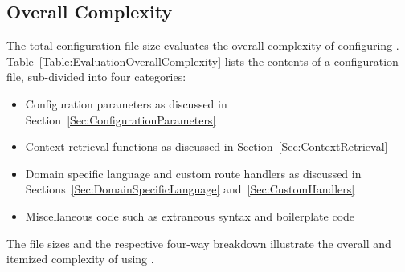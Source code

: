 \subsection{Overall Complexity}

The total configuration file size evaluates the overall complexity of configuring \sys{}. Table~\ref{Table:EvaluationOverallComplexity} lists the contents of a configuration file, sub-divided into four categories:

\begin{itemize}[nosep]

\item Configuration parameters as discussed in Section~\ref{Sec:ConfigurationParameters}

\item Context retrieval functions as discussed in Section~\ref{Sec:ContextRetrieval}

\item Domain specific language and custom route handlers as discussed in Sections~\ref{Sec:DomainSpecificLanguage} and~\ref{Sec:CustomHandlers}

\item Miscellaneous code such as extraneous syntax and boilerplate code

\end{itemize}

The file sizes and the respective four-way breakdown illustrate the overall and itemized complexity of using \sys{}.
 
